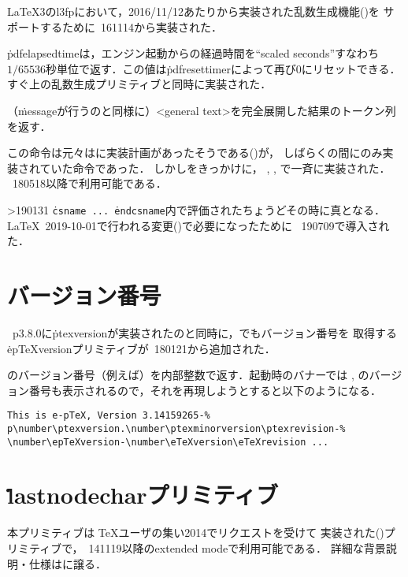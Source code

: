 \documentclass[a4paper,11pt,nomag]{jsarticle}
\begin{document}
\begin{cslist}
  \LaTeX3のl3fpにおいて，2016/11/12あたりから実装された乱数生成機能(\cite{random})を
  サポートするために\epTeX~161114から実装された．

  \.{pdfelapsedtime}は，エンジン起動からの経過時間を``scaled seconds''すなわち
  $1/65536$秒単位で返す．この値は\.{pdfresettimer}によって再び0にリセットできる．
  すぐ上の乱数生成プリミティブと同時に実装された．

  （\.{message}が行うのと同様に）<general text>を完全展開した結果のトークン列を返す．

  この命令は元々はに実装計画があったそうである(\cite{expanded})が，
  しばらくの間にのみ実装されていた命令であった．
  しかし\cite{expanded1}をきっかけに，
  , \epTeX, で一斉に実装された．
  \epTeX~180518以降で利用可能である．

\ifnum\epTeXversion>190131 %
  \csitem[\.{ifincsname}]
  \texttt{\.{csname}~...~\.{endcsname}}内で評価されたちょうどその時に真となる．
  \LaTeX~2019-10-01で行われる変更(\cite{latex95,tjb83})で必要になったために
  \epTeX~190709で導入された．
\fi %
\end{cslist}

\section{バージョン番号}
\pTeX~p3.8.0に\.{ptexversion}が実装されたのと同時に，\epTeX でもバージョン番号を
取得する\.{epTeXversion}プリミティブが\epTeX~180121から追加された．

\begin{cslist}
 \csitem[\.{epTeXversion}]
  \epTeX のバージョン番号（例えば\the\epTeXversion）を内部整数で返す．\epTeX 起動時のバナーでは
  \eTeX, \pTeX のバージョン番号も表示されるので，それを再現しようとすると以下のようになる．
\begin{verbatim}
This is e-pTeX, Version 3.14159265-%
p\number\ptexversion.\number\ptexminorversion\ptexrevision-%
\number\epTeXversion-\number\eTeXversion\eTeXrevision ...
\end{verbatim}


\end{cslist}


\section{\.{lastnodechar}プリミティブ}
本プリミティブは
\TeX ユーザの集い2014でリクエストを受けて
実装された(\cite{pdfse})プリミティブで，\epTeX~141119以降のextended modeで利用可能である．
詳細な背景説明・仕様は\cite{lnc}に譲る．
\end{document}
